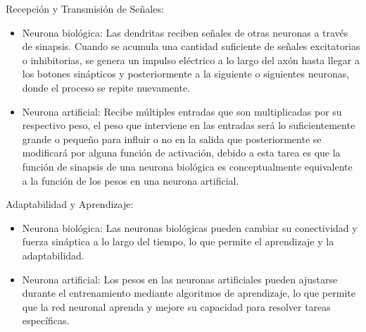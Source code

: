 Recepción y Transmisión de Señales:
\begin{itemize}
	\item	 Neurona biológica: Las dendritas reciben señales de otras neuronas a través de sinapsis. Cuando se acumula una cantidad suficiente de señales excitatorias o inhibitorias, se genera un impulso eléctrico a lo largo del axón hasta llegar a los botones sinápticos y posteriormente a la siguiente o siguientes neuronas, donde el proceso se repite nuevamente.
	\item	Neurona artificial: Recibe múltiples entradas que son multiplicadas por su respectivo peso, el peso que interviene en las entradas será lo suficientemente grande o pequeño para influir o no en la salida que posteriormente se modificará por alguna función de activación, debido a esta tarea es que la función de sinapsis de una neurona biológica es conceptualmente equivalente a la función de los pesos en una neurona artificial. 
\end{itemize}
Adaptabilidad y Aprendizaje:
\begin{itemize}
	\item	 Neurona biológica: Las neuronas biológicas pueden cambiar su conectividad y fuerza sináptica a lo largo del tiempo, lo que permite el aprendizaje y la adaptabilidad.
	\item	Neurona artificial: Los pesos en las neuronas artificiales pueden ajustarse durante el entrenamiento mediante algoritmos de aprendizaje, lo que permite que la red neuronal aprenda y mejore su capacidad para resolver tareas específicas.
\end{itemize}

